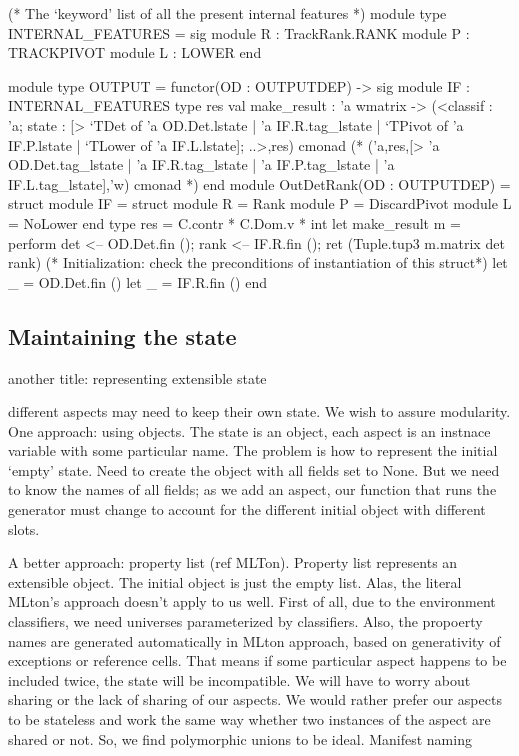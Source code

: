 \documentclass[draft]{elsart}
\begin{document}
\begin{code2}
(* The `keyword' list of all the present internal features *)
module type INTERNAL_FEATURES = sig
  module R      : TrackRank.RANK
  module P      : TRACKPIVOT
  module L      : LOWER
end

module type OUTPUT = functor(OD : OUTPUTDEP) -> sig
  module IF : INTERNAL_FEATURES
  type res
  val make_result : 'a wmatrix ->
   (<classif : 'a; 
     state : [> `TDet of 'a OD.Det.lstate |
                'a IF.R.tag_lstate |
                `TPivot of 'a IF.P.lstate |
                `TLower of 'a IF.L.lstate]; ..>,res) cmonad
   (*
    ('a,res,[> 'a OD.Det.tag_lstate | 'a IF.R.tag_lstate 
             | 'a IF.P.tag_lstate   | 'a IF.L.tag_lstate],'w) cmonad
      *)
end
module OutDetRank(OD : OUTPUTDEP) = struct
  module IF = struct
      module R   = Rank
      module P   = DiscardPivot
      module L   = NoLower end
  type res = C.contr * C.Dom.v * int
  let make_result m = perform
    det  <-- OD.Det.fin ();
    rank <-- IF.R.fin ();
    ret (Tuple.tup3 m.matrix det rank)
  (* Initialization: check the preconditions of instantiation of this struct*)
  let _ = OD.Det.fin ()
  let _ = IF.R.fin ()
end
\end{code2}



\subsection{Maintaining the state}
another title: representing extensible state

different aspects may need to keep their own state. We wish to assure
modularity. One approach: using objects. The state is an object, each
aspect is an instnace variable with some particular name. The problem
is how to represent the initial `empty' state. Need to create the
object with all fields set to None. But we need to know the names of
all fields; as we add an aspect, our function that runs the generator
must change to account for the different initial object with different
slots.

A better approach: property list (ref MLTon). Property list represents
an extensible object. The initial object is just the empty list. Alas,
the literal MLton's approach doesn't apply to us well. First of all,
due to the environment classifiers, we need universes parameterized by
classifiers. Also, the propoerty names are generated automatically in
MLton approach, based on generativity of exceptions or reference
cells. That means if some particular aspect happens to be included
twice, the state will be incompatible. We will have to worry about
sharing or the lack of sharing of our aspects. We would rather prefer
our aspects to be stateless and work the same way whether two
instances of the aspect are shared or not. So, we find polymorphic
unions to be ideal. Manifest naming 
\end{document}
